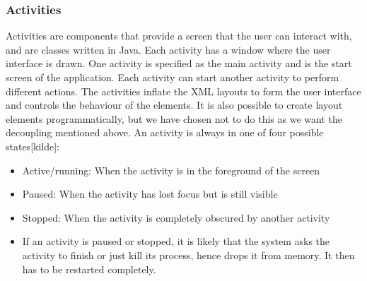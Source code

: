 \subsubsection{Activities}
Activities are components that provide a screen that the user can interact with, and are classes written in Java. Each activity has a window where the user interface is drawn. One activity is specified as the main activity and is the start screen of the application. Each activity can start another activity to perform different actions. The activities inflate the XML layouts to form the user interface and controls the behaviour of the elements. It is also possible to create layout elements programmatically, but we have chosen not to do this as we want the decoupling mentioned above.
\newline
\newline
An activity is always in one of four possible states[kilde]:
\begin{itemize}
\item{}Active/running: When the activity is in the foreground of the screen
\item{}Paused: When the activity has lost focus but is still visible
\item{}Stopped: When the activity is completely obscured by another activity
\item{}If an activity is paused or stopped, it is likely that the system asks the activity to finish or just kill its process, hence drops it from memory. It then has to be restarted completely.
\end{itemize}

